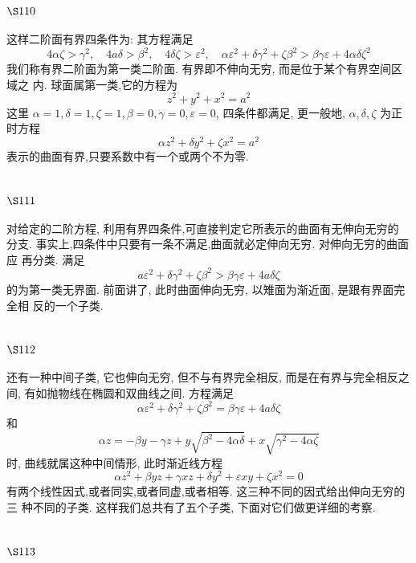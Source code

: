 \section{$\S 110$}

这样二阶面有界四条件为: 其方程满足
\[
4 \alpha \zeta>\gamma^{2}, \quad 4 a \delta>\beta^{2}, \quad 4 \delta \zeta>\varepsilon^{2}, \quad \alpha \varepsilon^{2}+\delta \gamma^{2}+\zeta \beta^{2}>\beta \gamma \varepsilon+4 \alpha \delta \zeta^{2}
\]
我们称有界二阶面为第一类二阶面. 有界即不伸向无穷, 而是位于某个有界空间区域之 内. 球面属第一类,它的方程为
\[
z^{2}+y^{2}+x^{2}=a^{2}
\]
这里 $\alpha=1, \delta=1, \zeta=1, \beta=0, \gamma=0, \varepsilon=0$, 四条件都满足, 更一般地, $\alpha, \delta, \zeta$ 为正时方程
\[
\alpha z^{2}+\delta y^{2}+\zeta x^{2}=a^{2}
\]
表示的曲面有界,只要系数中有一个或两个不为零.

\section{$\S 111$}

对给定的二阶方程, 利用有界四条件,可直接判定它所表示的曲面有无伸向无穷的 分支. 事实上,四条件中只要有一条不满足,曲面就必定伸向无穷. 对伸向无穷的曲面应 再分类. 满足
\[
a \varepsilon^{2}+\delta \gamma^{2}+\zeta \beta^{2}>\beta \gamma \varepsilon+4 a \delta \zeta
\]
的为第一类无界面. 前面讲了, 此时曲面伸向无穷, 以雉面为渐近面, 是跟有界面完全相 反的一个子类.

\section{$\S 112$}

还有一种中间子类, 它也伸向无穷, 但不与有界完全相反, 而是在有界与完全相反之 间, 有如抛物线在椭圆和双曲线之间. 方程满足
\[
\alpha \varepsilon^{2}+\delta \gamma^{2}+\zeta \beta^{2}=\beta \gamma \varepsilon+4 a \delta \zeta
\]
和
\[
\alpha z=-\beta y-\gamma z+y \sqrt{\beta^{2}-4 \alpha \delta}+x \sqrt{\gamma^{2}-4 \alpha \zeta}
\]
时, 曲线就属这种中间情形, 此时渐近线方程
\[
\alpha z^{2}+\beta y z+\gamma x z+\delta y^{2}+\varepsilon x y+\zeta x^{2}=0
\]
有两个线性因式,或者同实,或者同虚,或者相等. 这三种不同的因式给出伸向无穷的三 种不同的子类. 这样我们总共有了五个子类, 下面对它们做更详细的考察.

\section{$\S 113$}

